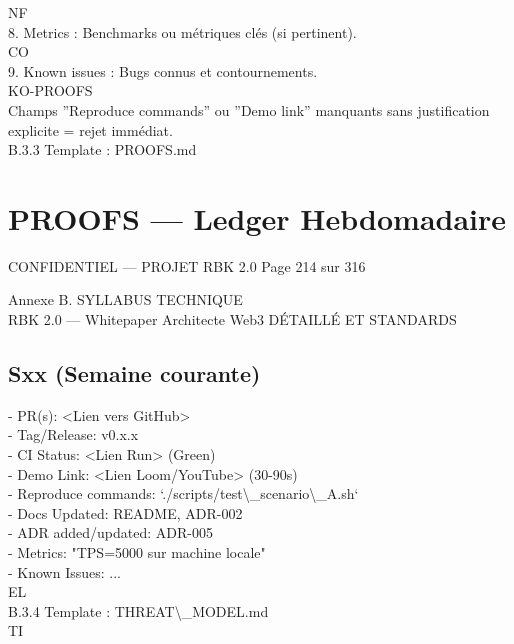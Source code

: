 \documentclass[12pt,landscape,a4paper]{article}
\newenvironment{confidential}
{\begin{tcolorbox}[
    colback=rbkred!5!white,
    colframe=rbkred!75!black,
    title=CONFIDENTIEL,
    fonttitle=\bfseries\color{white},
    coltitle=rbkred!75!black,
    breakable,
    enhanced,
    frame hidden,
    borderline west={2pt}{0pt}{rbkred!75!black}
]}
{\end{tcolorbox}}
\begin{document}
\vspace{0.5em}
NF\\
8. Metrics : Benchmarks ou métriques clés (si pertinent).\\
CO\\
9. Known issues : Bugs connus et contournements.\\
\vspace{0.5em}
KO-PROOFS\\
Champs ”Reproduce commands” ou ”Demo link” manquants sans justification explicite = rejet immédiat.\\
\vspace{0.5em}
\vspace{0.5em}
B.3.3 Template : PROOFS.md\\
\section*{PROOFS --- Ledger Hebdomadaire}
\vspace{0.5em}
\vspace{0.5em}
\vspace{0.5em}
\vspace{0.5em}
\begin{confidential}CONFIDENTIEL — PROJET RBK 2.0                               Page 214 sur 316\end{confidential}
Annexe B. SYLLABUS TECHNIQUE\\
RBK 2.0 — Whitepaper Architecte Web3                                          DÉTAILLÉ ET STANDARDS\\
\vspace{0.5em}
\vspace{0.5em}
\vspace{0.5em}
\subsection*{Sxx (Semaine courante)}
- PR(s): \textless{}Lien vers GitHub\textgreater{}\\
- Tag/Release: v0.x.x\\
- CI Status: \textless{}Lien Run\textgreater{} (Green)\\
- Demo Link: \textless{}Lien Loom/YouTube\textgreater{} (30-90s)\\
- Reproduce commands: `./scripts/test\textbackslash{}_scenario\textbackslash{}_A.sh`\\
- Docs Updated: README, ADR-002\\
- ADR added/updated: ADR-005\\
- Metrics: "TPS=5000 sur machine locale"\\
- Known Issues: ...\\
\vspace{0.5em}
\vspace{0.5em}
\vspace{0.5em}
\vspace{0.5em}
EL\\
B.3.4 Template : THREAT\textbackslash{}_MODEL.md\\
\vspace{0.5em}
\vspace{0.5em}
\vspace{0.5em}
\vspace{0.5em}
TI\\
\end{document}
